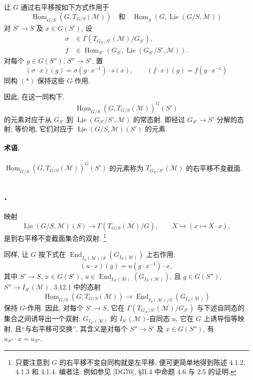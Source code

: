 让 \(G\) 通过右平移按如下方式作用于
\[
 \underline{\operatorname{Hom}}_{G/S}(G,T_{G/S}(\mathcal M))
 \quad\text{和}\quad
 \underline{\operatorname{Hom}}_S
   (G,\underline{\operatorname{Lie}}(G/S,\mathcal M))
\]
对 \(S'\to S\) 及 \(x\in G(S')\), 设
\[
\begin{aligned}
 \sigma&\in\Gamma(T_{G_{S'}/S'}(\mathcal M)/G_{S'}),\\
 f&\in\operatorname{Hom}_{S'}
 (G_{S'},\underline{\operatorname{Lie}}(G_{S'}/S',\mathcal M)).
\end{aligned}
\]
对每个 \(g\in G(S'')\), \(S''\to S'\), 置
\[
 (\sigma\cdot x)(g)=\sigma(g\cdot x^{-1})\cdot s(x),
 \qquad
 (f\cdot x)(g)=f(g\cdot x^{-1})
\]
同构 \((*)\) 保持这些 \(G\)-作用.

因此, 在这一同构下,
\[
 \underline{\operatorname{Hom}}_{G/S}
   (G,T_{G/S}(\mathcal M))^G(S')
\]
的元素对应于从 \(G_{S'}\) 到
\(\underline{\operatorname{Lie}}(G_{S'}/S',\mathcal M)\) 的常态射,
即经过 \(G_{S'}\to S'\) 分解的态射; 等价地,
它们对应于 \(\underline{\operatorname{Lie}}(G/S,\mathcal M)(S')\) 的元素.

\paragraph{术语.}
\(\underline{\operatorname{Hom}}_{G/S}
(G,T_{G/S}(\mathcal M))^G(S')\) 的元素称为
\(T_{G_{S'}/S'}(\mathcal M)\) 的右平移不变截面.

\subsection*{.}
映射
\[
 \underline{\operatorname{Lie}}(G/S,\mathcal M)(S)
 \longrightarrow \Gamma(T_{G/S}(\mathcal M)/G),
 \qquad X\longmapsto (x\mapsto X\cdot x),
\]
是到右平移不变截面集合的双射.
\footnote{只要注意到 \(G\) 的右平移不变自同构就是左平移,
便可更简单地得到陈述 4.1.2, 4.1.3 和 4.1.4.
编者注: 例如参见 \textup{[DG70]}, \S II.4 中命题 4.6 与 2.5 的证明.}

同样, 让 \(G\) 按下式在
\(\underline{\operatorname{End}}_{I_S(\mathcal M)/S}
(G_{I_S(\mathcal M)})\) 上右作用:
\[
 (u\cdot x)(g)=u(g\cdot x^{-1})\cdot x,
\]
其中 \(S'\to S\), \(x\in G(S')\),
\(u\in\operatorname{End}_{I_{S'}(\mathcal M)}
(G_{I_{S'}(\mathcal M)})\), 且 \(g\in G(S'')\),
\(S''\to I_{S'}(\mathcal M)\). 3.12.1 中的态射
\[
 \underline{\operatorname{Hom}}_{G/S}(G,T_{G/S}(\mathcal M))
 \longrightarrow
 \underline{\operatorname{End}}_{I_S(\mathcal M)/S}
   (G_{I_S(\mathcal M)})
\]
保持 \(G\)-作用. 因此, 对每个 \(S'\to S\), 它在
\(\Gamma(T_{G_{S'}/S'}(\mathcal M)/G_{S'})\) 与下述自同态的集合之间诱导出一个双射:
\(G_{I_{S'}(\mathcal M)}\) 的 \(I_{S'}(\mathcal M)\)-自同态 \(u\),
它在 \(G\) 上诱导恒等映射, 且“与右平移可交换”, 其含义是对每个 \(S''\to S'\)
及 \(x\in G(S'')\), 有 \(u_{S''}\cdot x=u_{S''}\).

